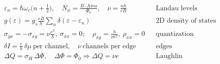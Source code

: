 \begin{fact}
\begin{align*}
    &\varepsilon_n = \hbar\omega_c\bigl(n+\tfrac12\bigr),\quad N_\phi = \frac{B\cdot\text{Area}}{\Phi_0},\quad \nu = \frac{nh}{eB} && \text{Landau levels}\\
    &g(\varepsilon) = g_s\frac{eB}{h}\sum_n\delta(\varepsilon-\varepsilon_n) && \text{2D density of states}\\
    &\sigma_{yx} = -\sigma_{xy} = \nu\frac{e^2}{h},\ \sigma_{xx} = 0;\quad \rho_{xy} = \frac{h}{\nu e^2},\ \rho_{xx} = 0 && \text{quantization}\\
    &\delta I = \frac{e}{h}\,\delta\mu\ \text{per channel},\quad \nu\ \text{channels per edge} && \text{edges}\\
    &\Delta Q = \sigma_H\,\Delta\Phi,\quad \Delta\Phi = \Phi_0\Rightarrow\Delta Q = \nu e && \text{Laughlin}
\end{align*}
\end{fact}
